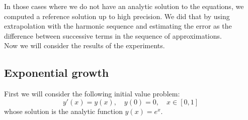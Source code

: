 
In those cases where we do not have an analytic solution to the equations, we computed a reference solution up to high precision. We did that by using extrapolation with the harmonic sequence and estimating the error as the difference between successive terms in the sequence of approximations.\\

Now we will consider the results of the experiments.

\subsection{Exponential growth}
First we will consider the following initial value problem:
\begin{equation}\label{42}
y'(x) = y(x),\quad y(0) = 0, \quad x\in [0,1]
\end{equation}
whose solution is the analytic function \(y(x) = e^x\).

